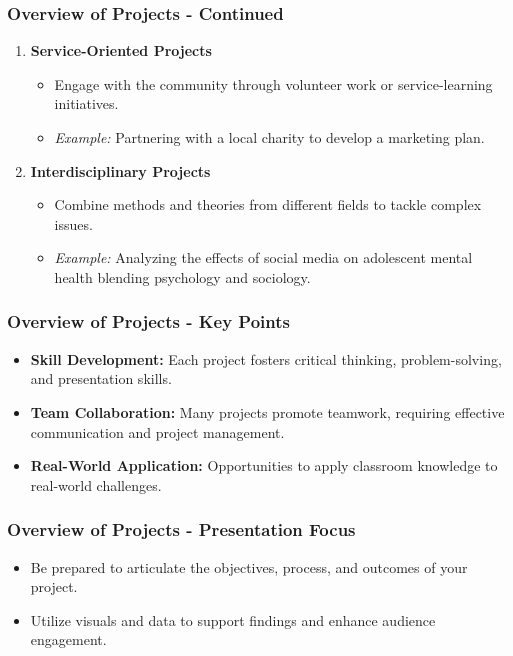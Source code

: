 \documentclass[aspectratio=169]{beamer}
\begin{document}
\begin{frame}[fragile]
    \frametitle{Overview of Projects - Continued}
    \begin{enumerate}[resume]
        \item \textbf{Service-Oriented Projects}
            \begin{itemize}
                \item Engage with the community through volunteer work or service-learning initiatives.
                \item \textit{Example:} Partnering with a local charity to develop a marketing plan.
            \end{itemize}

        \item \textbf{Interdisciplinary Projects}
            \begin{itemize}
                \item Combine methods and theories from different fields to tackle complex issues.
                \item \textit{Example:} Analyzing the effects of social media on adolescent mental health blending psychology and sociology.
            \end{itemize}
    \end{enumerate}
\end{frame}

\begin{frame}[fragile]
    \frametitle{Overview of Projects - Key Points}
    \begin{itemize}
        \item \textbf{Skill Development:} Each project fosters critical thinking, problem-solving, and presentation skills.
        \item \textbf{Team Collaboration:} Many projects promote teamwork, requiring effective communication and project management.
        \item \textbf{Real-World Application:} Opportunities to apply classroom knowledge to real-world challenges.
    \end{itemize}
\end{frame}

\begin{frame}[fragile]
    \frametitle{Overview of Projects - Presentation Focus}
    \begin{itemize}
        \item Be prepared to articulate the objectives, process, and outcomes of your project.
        \item Utilize visuals and data to support findings and enhance audience engagement.
    \end{itemize}
\end{frame}
\end{document}
